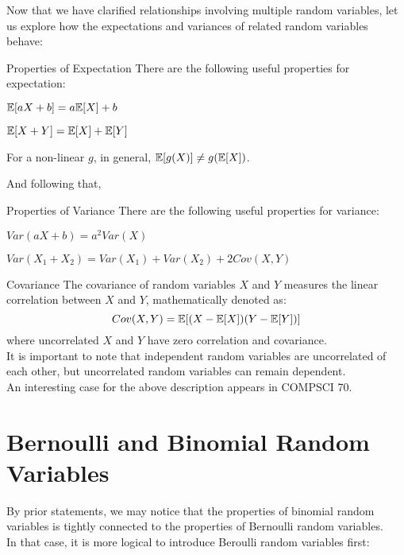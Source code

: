 Now that we have clarified relationships involving multiple random variables, let us explore how the expectations and variances of related random variables behave:
\begin{ln-define}{Properties of Expectation}{}
    There are the following useful properties for expectation:
    \begin{bindenum}
        \item $\mathbb{E}[aX + b] = a\mathbb{E}[X] + b$
        \item $\mathbb{E}[X + Y] = \mathbb{E}[X] + \mathbb{E}[Y]$
        \item For a non-linear $g$, in general, $\mathbb{E}[g(X)] \neq g(\mathbb{E}[X])$.
    \end{bindenum}
\end{ln-define}
And following that,
\begin{ln-define}{Properties of Variance}{}
    There are the following useful properties for variance:
    \begin{bindenum}
        \item $Var(aX + b) = a^2 Var(X)$
        \item $Var(X_1 + X_2) = Var(X_1) + Var(X_2) + 2Cov(X, Y)$
    \end{bindenum}
    \begin{ln-define}{Covariance}{}
        The covariance of random variables $X$ and $Y$ measures the linear correlation between $X$ and $Y$, mathematically denoted as:
        \[Cov(X, Y) = \mathbb{E}[(X - \mathbb{E}[X])(Y - \mathbb{E}[Y])]\]
        where uncorrelated $X$ and $Y$ have zero correlation and covariance. \\
        It is important to note that independent random variables are uncorrelated of each other, but uncorrelated random variables can remain dependent. \\
        An interesting case for the above description appears in COMPSCI 70.
    \end{ln-define}
\end{ln-define}

\section{Bernoulli and Binomial Random Variables}
By prior statements, we may notice that the properties of binomial random variables is tightly connected to the properties of Bernoulli random variables. \\
In that case, it is more logical to introduce Beroulli random variables first:

